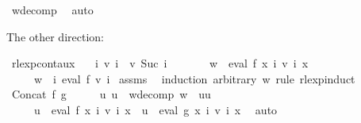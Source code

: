 \begin{isabellebody}
\ w{\isacharunderscore}{\kern0pt}decomp\ \isamarkupfalse%
\ auto\isanewline
{}\isamarkupfalse%
%
\endisatagproof
{\isafoldproof}%
%
\isadelimproof
%
\endisadelimproof
%
\begin{isamarkuptext}%
The other direction:%
\end{isamarkuptext}\isamarkuptrue%
\isamarkupfalse%
\ rlexp{\isacharunderscore}{\kern0pt}cont{\isacharunderscore}{\kern0pt}aux{}{\isacharcolon}{\kern0pt}\isanewline
\ \ \ {\isachardoublequoteopen}{\isasymforall}i{\isachardot}{\kern0pt}\ v\ i\ {\isasymle}\ v\ {\isacharparenleft}{\kern0pt}Suc\ i{\isacharparenright}{\kern0pt}{\isachardoublequoteclose}\isanewline
\ \ \ \ \ \ \ {\isachardoublequoteopen}w\ {\isasymin}\ eval\ f\ {\isacharparenleft}{\kern0pt}{\isasymlambda}x{\isachardot}{\kern0pt}\ {\isasymUnion}i{\isachardot}{\kern0pt}\ v\ i\ x{\isacharparenright}{\kern0pt}{\isachardoublequoteclose}\isanewline
\ \ \ \ \ {\isachardoublequoteopen}w\ {\isasymin}\ {\isacharparenleft}{\kern0pt}{\isasymUnion}i{\isachardot}{\kern0pt}\ eval\ f\ {\isacharparenleft}{\kern0pt}v\ i{\isacharparenright}{\kern0pt}{\isacharparenright}{\kern0pt}{\isachardoublequoteclose}\isanewline
%
\isadelimproof
%
\endisadelimproof
%
\isatagproof
{}\isamarkupfalse%
\ assms\ \isamarkupfalse%
\ {\isacharparenleft}{\kern0pt}induction\ arbitrary{\isacharcolon}{\kern0pt}\ w\ rule{\isacharcolon}{\kern0pt}\ rlexp{\isachardot}{\kern0pt}induct{\isacharparenright}{\kern0pt}\isanewline
\ \ \isamarkupfalse%
\ {\isacharparenleft}{\kern0pt}Concat\ f\ g{\isacharparenright}{\kern0pt}\isanewline
\ \ \isamarkupfalse%
\ \isamarkupfalse%
\ u\ u{\isacharprime}{\kern0pt}\ \ w{\isacharunderscore}{\kern0pt}decomp{\isacharcolon}{\kern0pt}\ {\isachardoublequoteopen}w\ {\isacharequal}{\kern0pt}\ u{\isacharat}{\kern0pt}u{\isacharprime}{\kern0pt}{\isachardoublequoteclose}\isanewline
\ \ \ \ \ {\isachardoublequoteopen}u\ {\isasymin}\ eval\ f\ {\isacharparenleft}{\kern0pt}{\isasymlambda}x{\isachardot}{\kern0pt}\ {\isasymUnion}i{\isachardot}{\kern0pt}\ v\ i\ x{\isacharparenright}{\kern0pt}\ {\isasymand}\ u{\isacharprime}{\kern0pt}\ {\isasymin}\ eval\ g\ {\isacharparenleft}{\kern0pt}{\isasymlambda}x{\isachardot}{\kern0pt}\ {\isasymUnion}i{\isachardot}{\kern0pt}\ v\ i\ x{\isacharparenright}{\kern0pt}{\isachardoublequoteclose}\ \isamarkupfalse%
\ auto\isanewline

\end{isabellebody}
